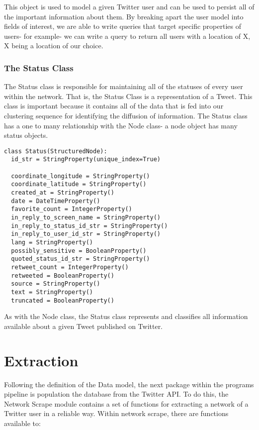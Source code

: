 This object is used to model a given Twitter user and can be used to
persist all of the important information about them. By breaking apart
the user model into fields of interest, we are able to write queries
that target specific properties of users- for example- we can write a
query to return all users with a location of X, X being a location of
our choice.

\subsubsection{The  Status Class}
The Status class is responsible for maintaining all of the statuses of
every user within the network. That is, the Status Class is a
representation of a Tweet. This class is important because it contains
all of the data that is fed into our clustering sequence for
identifying the diffusion of information. The Status class has a one
to many relationship with the Node class- a node object has many
status objects.

\begin{lstlisting}
class Status(StructuredNode):
  id_str = StringProperty(unique_index=True)

  coordinate_longitude = StringProperty()
  coordinate_latitude = StringProperty()
  created_at = StringProperty()
  date = DateTimeProperty()
  favorite_count = IntegerProperty()
  in_reply_to_screen_name = StringProperty()
  in_reply_to_status_id_str = StringProperty()
  in_reply_to_user_id_str = StringProperty()
  lang = StringProperty()
  possibly_sensitive = BooleanProperty()
  quoted_status_id_str = StringProperty()
  retweet_count = IntegerProperty()
  retweeted = BooleanProperty()
  source = StringProperty()
  text = StringProperty()
  truncated = BooleanProperty()
\end{lstlisting}

As with the Node class, the Status class represents and classifies all
information available about a given Tweet published on Twitter.

\section{Extraction}
Following the definition of the Data model, the next package within
the programs pipeline is population the database from the Twitter API.
To do this, the Network Scrape module contains a set of functions for
extracting a network of a Twitter user in a reliable way. Within
network scrape, there are functions available to:

